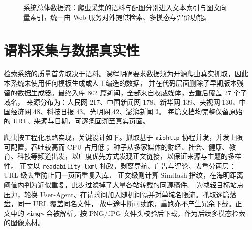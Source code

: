 \documentclass[11pt,a4paper]{ctexart}
\begin{document}
\begin{figure}[ht]
\centering
{}
\caption{系统总体数据流：爬虫采集的语料与配图分别进入文本索引与图文向量索引，统一由 Web 服务对外提供检索、多模态与评价功能。}
\label{fig:arch}
\end{figure}


\section{语料采集与数据真实性}

检索系统的质量首先取决于语料。课程明确要求数据须为开源爬虫真实抓取，因此本系统未使用任何模板生成或人工编造的数据，
并在代码层面删除了早期版本残留的数据生成器。最终入库 802 篇新闻，全部来自权威媒体，去重后覆盖 27 个子域名，
来源分布为：人民网 217、中国新闻网 178、新华网 139、央视网 130、中国经济网 48、科技日报 43、光明网 42、澎湃新闻 3。
每篇文档均完整保留原始的 URL、来源与日期，可逐条回溯至真实页面。

爬虫按工程化思路实现，关键设计如下。抓取基于 \texttt{aiohttp} 协程并发，并发上限可配置，吞吐较高而 CPU 占用低；
种子从多家媒体的财经、社会、健康、教育、科技等频道出发，以广度优先方式发现正文链接，以保证来源与主题的多样性。
正文以 \texttt{readability-lxml} 抽取，剥离导航、广告与评论。去重分两层：URL 级去重防止同一页面重复入库，
正文级则计算 SimHash 指纹，在海明距离阈值内判为近似重复，此步过滤掉了大量各站转载的同源稿件。
为减轻目标站点压力，轮换 User-Agent、在请求间加入随机间隔并对单域名限流。抓取逐篇落盘，同一 URL 覆盖同名文件，
故中途中断可续跑，重跑亦不产生冗余下载。正文中的 \texttt{<img>} 会被解析，按 PNG/JPG 文件头校验后下载，作为后续多模态检索的图像素材。
\end{document}
